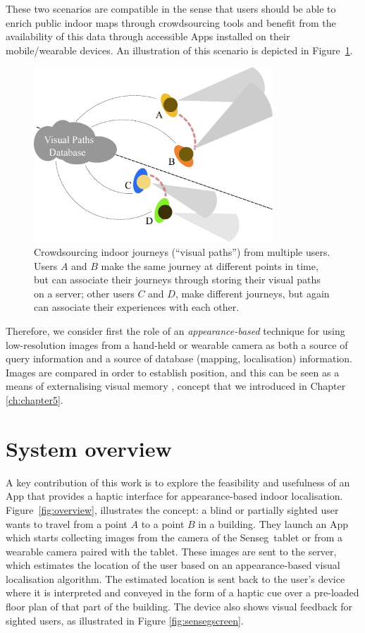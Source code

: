 These two scenarios are compatible in the sense that users should be able to enrich public indoor maps through crowdsourcing tools and benefit from the availability of this data through accessible Apps installed on their mobile/wearable devices. An illustration of this scenario is depicted in Figure~\ref{fig:associatingViews}.

\begin{figure}[h]
\centering
\includegraphics[width=0.8\textwidth]{./gfx/Chapter06/AssociatingViews.pdf}
\caption{Crowdsourcing indoor journeys (``visual paths'') from multiple users.  Users $A$ and $B$ make the same journey at different points in time, but can associate their journeys through storing their visual paths on a server; other users $C$ and $D$, make different journeys, but again can associate their experiences with each other.}
\label{fig:associatingViews}
\end{figure}

Therefore, we consider first the role of an {\em appearance-based} technique for using low-resolution images from a hand-held or wearable camera as both a source of query information and a source of database (mapping, localisation) information. Images are compared in order to establish position, and this can be seen as a means of externalising visual memory \citep{tversky2000some}, concept that we introduced in Chapter \ref{ch:chapter5}. 

\section{System overview}
\label{sec:overview}

A key contribution of this work is to explore the feasibility and usefulness of an App that provides a haptic interface for appearance-based indoor localisation. Figure~\ref{fig:overview}, illustrates the concept: a blind or partially sighted user wants to travel from a point $A$ to a point $B$ in a building. They launch an App which starts collecting images from the camera of the Senseg\texttrademark\ tablet or from a wearable camera paired with the tablet. These images are sent to the server, which estimates the location of the user based on an appearance-based visual localisation algorithm. The estimated location is sent back to the user's device where it is interpreted and conveyed in the form of a haptic cue over a pre-loaded floor plan of that part of the building. The device also shows visual feedback for sighted users, as illustrated in Figure \ref{fig:sensegscreen}.


